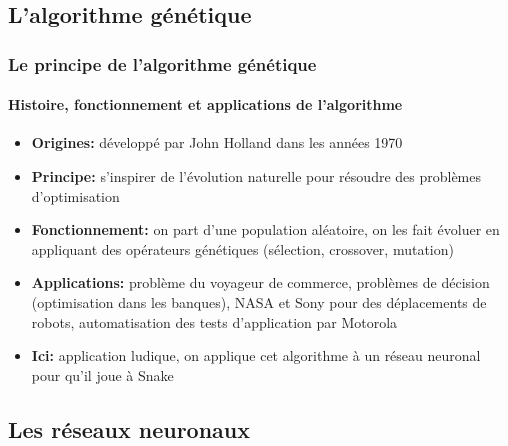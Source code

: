 \documentclass[10pt]{beamer}
\begin{document}
\subsection{L'algorithme génétique}
\begin{frame}
\frametitle{Le principe de l'algorithme génétique}
\framesubtitle{Histoire, fonctionnement et applications de l'algorithme}
\begin{itemize}
\item \textbf{Origines:} développé par John Holland dans les années 1970
\item \textbf{Principe:} s'inspirer de l'évolution naturelle pour
    résoudre des problèmes d'optimisation
\item \textbf{Fonctionnement:} on part d'une population aléatoire, on les fait évoluer en appliquant des opérateurs
    génétiques (sélection, crossover, mutation)
\item \textbf{Applications:} problème du voyageur de commerce, problèmes de décision (optimisation dans les banques), NASA et Sony pour des déplacements de robots, automatisation des tests d'application par Motorola

\item \textbf{Ici:} application ludique, on applique cet algorithme à un réseau neuronal pour qu'il joue à Snake
\end{itemize}
\end{frame}

\subsection{Les réseaux neuronaux}
\end{document}
